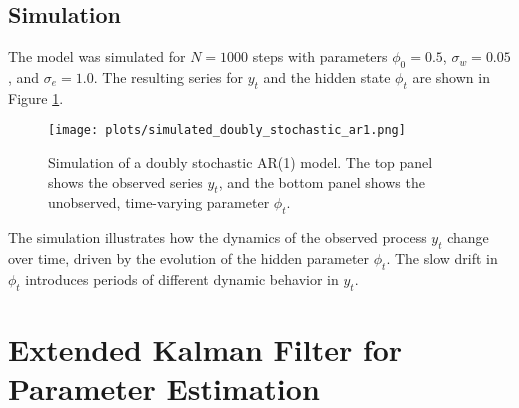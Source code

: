 \documentclass[11pt, a4paper]{article}
\begin{document}
\subsection{Simulation}
The model was simulated for $N=1000$ steps with parameters $\phi_0=0.5$, $\sigma_w=0.05$, and $\sigma_e=1.0$. The resulting series for $y_t$ and the hidden state $\phi_t$ are shown in Figure \ref{fig:doubly_stochastic}.

\begin{figure}[H]
    \centering
    \texttt{[image: plots/simulated\_doubly\_stochastic\_ar1.png]}
    \caption{Simulation of a doubly stochastic AR(1) model. The top panel shows the observed series $y_t$, and the bottom panel shows the unobserved, time-varying parameter $\phi_t$.}
    \label{fig:doubly_stochastic}
\end{figure}

The simulation illustrates how the dynamics of the observed process $y_t$ change over time, driven by the evolution of the hidden parameter $\phi_t$. The slow drift in $\phi_t$ introduces periods of different dynamic behavior in $y_t$.

\section{Extended Kalman Filter for Parameter Estimation}
\end{document}
